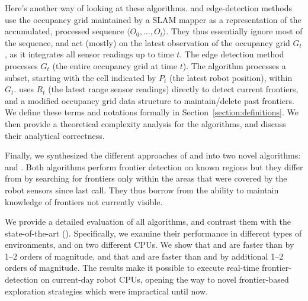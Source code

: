 Here's another way of looking at these algorithms. \WFD and edge-detection methods use the occupancy grid
maintained by a SLAM mapper as a representation of the accumulated, processed sequence $\langle
O_0,\ldots,O_t\rangle$. They thus essentially ignore most of the sequence, and
act (mostly) on the latest observation of the occupancy grid $G_t$, as it integrates all
sensor readings up to time $t$. The edge detection method processes $G_t$ (the
entire occupancy grid at time $t$). The \WFD algorithm processes a subset,
starting with the cell indicated by $P_t$ (the latest robot position), within
$G_t$.  \FFD uses $R_t$ (the latest range sensor readings) directly to detect current frontiers, and a modified
occupancy grid data structure to maintain/delete past frontiers.
We define these terms and notations formally in Section~\ref{section:definitions}. We then  
provide a theoretical complexity analysis for the algorithms,
and discuss their analytical correctness. 

Finally, we synthesized the different approaches of \WFD and \FFD into two 
novel algorithms: \WFDINC and \WFDIP. Both algorithms
perform frontier detection on known regions but they differ from \WFD by
searching for frontiers only within the areas that were covered by the robot
sensors since last call. They thus borrow from \FFD the ability to maintain
knowledge of frontiers not currently visible.


We provide a detailed evaluation of all algorithms, and contrast them 
with the state-of-the-art (\SOTA). %
Specifically, we examine their performance in different types of environments,
 and on two different CPUs. We show that \WFD and \WFDINC are faster than \SOTA by 1--2 orders of
magnitude, and that \FFD and \WFDIP are faster than \WFD and \WFDINC by 
additional 1--2 orders of magnitude.  The results make it possible to execute real-time
frontier-detection on current-day robot CPUs, opening the way to novel
frontier-based exploration strategies which were impractical until now.
